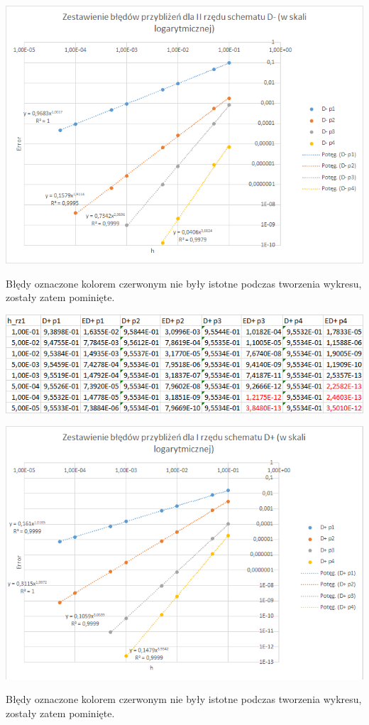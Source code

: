 \includegraphics{Lab2/charts/rz2_log_Db.png}
\newpage

Błędy oznaczone kolorem czerwonym nie były istotne podczas tworzenia wykresu, zostały zatem pominięte.

\includegraphics{Lab2/charts/rz1_log_Df_dane.png}

\includegraphics{Lab2/charts/rz1_log_Df.png}
\newpage

Błędy oznaczone kolorem czerwonym nie były istotne podczas tworzenia wykresu, zostały zatem pominięte.

